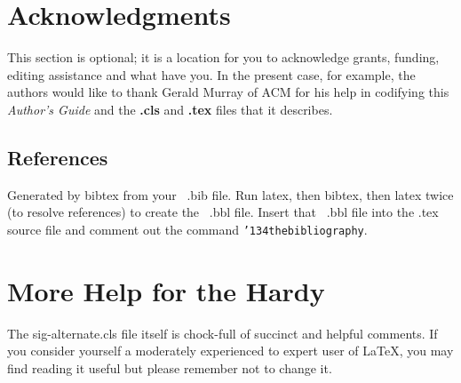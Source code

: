 \documentclass{sig-alternate}
\begin{document}
\section{Acknowledgments}
This section is optional; it is a location for you
to acknowledge grants, funding, editing assistance and
what have you.  In the present case, for example, the
authors would like to thank Gerald Murray of ACM for
his help in codifying this \textit{Author's Guide}
and the \textbf{.cls} and \textbf{.tex} files that it describes.

%


%
%

\subsection{References}
Generated by bibtex from your ~.bib file.  Run latex,
then bibtex, then latex twice (to resolve references)
to create the ~.bbl file.  Insert that ~.bbl file into
the .tex source file and comment out
the command \texttt{{\char'134}thebibliography}.
\section{More Help for the Hardy}
The sig-alternate.cls file itself is chock-full of succinct
and helpful comments.  If you consider yourself a moderately
experienced to expert user of \LaTeX, you may find reading
it useful but please remember not to change it.
\end{document}
